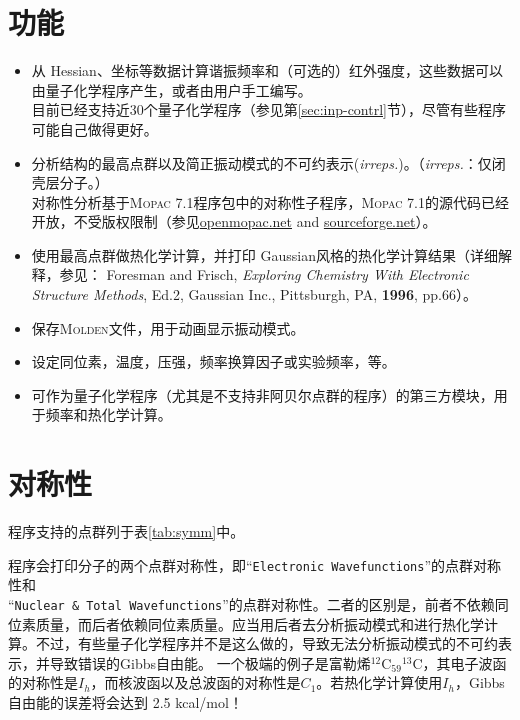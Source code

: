\documentclass[12pt,a4paper,openany,twoside,cap]{ctexbook}
\begin{document}
\section{功能} \label{sec:feature}

\begin{itemize}
\item 从 Hessian、坐标等数据计算谐振频率和（可选的）红外强度，这些数据可以由量子化学程序产生，或者由用户手工编写。 \\
目前已经支持近30个量子化学程序（参见第\ref{sec:inp-contrl}节），尽管有些程序可能自己做得更好。
\item 分析结构的最高点群以及简正振动模式的不可约表示(\emph{irreps.})。（\emph{irreps.}：仅闭壳层分子。） \\
对称性分析基于\textsc{Mopac} 7.1程序包中的对称性子程序，\textsc{Mopac} 7.1的源代码已经开放，不受版权限制（参见\href{http://openmopac.net/Downloads/Downloads.html}{openmopac.net} and \href{https://sourceforge.net/projects/mopac7/}{sourceforge.net}）。
\item 使用最高点群做热化学计算，并打印 Gaussian风格的热化学计算结果（详细解释，参见： Foresman and Frisch, \emph{Exploring Chemistry With Electronic Structure Methods}, Ed.2, Gaussian Inc., Pittsburgh, PA, \textbf{1996}, pp.66）。
\item 保存\textsc{Molden}文件，用于动画显示振动模式。
\item 设定同位素，温度，压强，频率换算因子或实验频率，等。
\item 可作为量子化学程序（尤其是不支持非阿贝尔点群的程序）的第三方模块，用于频率和热化学计算。
\end{itemize}

\section{对称性} \label{sec:symm}

程序支持的点群列于表\ref{tab:symm}中。

程序会打印分子的两个点群对称性，即``\verb|Electronic Wavefunctions|''的点群对称性和 \\
``\verb|Nuclear & Total Wavefunctions|''的点群对称性。二者的区别是，前者不依赖同位素质量，而后者依赖同位素质量。应当用后者去分析振动模式和进行热化学计算。不过，有些量子化学程序并不是这么做的，导致无法分析振动模式的不可约表示，并导致错误的Gibbs自由能。
一个极端的例子是富勒烯$^{12}$C$_{59}{}^{13}$C，其电子波函的对称性是$I_h$，而核波函以及总波函的对称性是$C_1$。若热化学计算使用$I_h$，Gibbs自由能的误差将会达到 2.5 kcal/mol！
\end{document}
